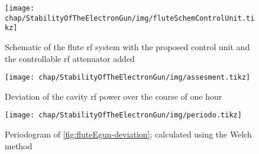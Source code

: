 \begin{figure}[tb]
	\centering
	\texttt{[image: chap/StabilityOfTheElectronGun/img/fluteSchemControlUnit.tikz]}
	\caption[FLUTE RF schematic with control unit]{Schematic of the \gls{flute} \gls{rf} system with the proposed control unit and the controllable \gls{rf} attenuator added}
	\label{fig:fluteEgun-rfschematicControl}
\end{figure}

\begin{figure}[tb]
	\centering
	\texttt{[image: chap/StabilityOfTheElectronGun/img/assesment.tikz]}
	\caption{Deviation of the cavity \gls{rf} power over the course of one hour}
	\label{fig:fluteEgun-deviation}
\end{figure}

\begin{figure}[tb]
	\centering
	\texttt{[image: chap/StabilityOfTheElectronGun/img/periodo.tikz]}
	\caption{Periodogram of \autoref{fig:fluteEgun-deviation}; calculated using the Welch method}
	\label{fig:fluteEgun-periodo}
\end{figure}




